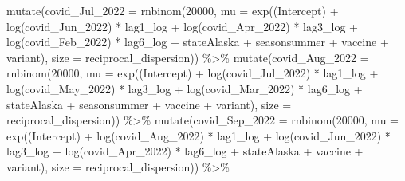 \documentclass[
]{book}
\newenvironment{Shaded}{\begin{snugshade}}{\end{snugshade}}
\newcommand{\AttributeTok}[1]{\textcolor[rgb]{0.77,0.63,0.00}{#1}}
\newcommand{\DecValTok}[1]{\textcolor[rgb]{0.00,0.00,0.81}{#1}}
\newcommand{\FunctionTok}[1]{\textcolor[rgb]{0.00,0.00,0.00}{#1}}
\newcommand{\NormalTok}[1]{#1}
\newcommand{\SpecialCharTok}[1]{\textcolor[rgb]{0.00,0.00,0.00}{#1}}
\newcommand{\StringTok}[1]{\textcolor[rgb]{0.31,0.60,0.02}{#1}}
\begin{document}
\begin{Shaded}
\begin{Highlighting}[]
  \FunctionTok{mutate}\NormalTok{(}\AttributeTok{covid\_Jul\_2022 =} \FunctionTok{rnbinom}\NormalTok{(}\DecValTok{20000}\NormalTok{, }\AttributeTok{mu =} \FunctionTok{exp}\NormalTok{(}\StringTok{\textasciigrave{}}\AttributeTok{(Intercept)}\StringTok{\textasciigrave{}} \SpecialCharTok{+} \FunctionTok{log}\NormalTok{(covid\_Jun\_2022) }\SpecialCharTok{*}\NormalTok{ lag1\_log }\SpecialCharTok{+} \FunctionTok{log}\NormalTok{(covid\_Apr\_2022) }\SpecialCharTok{*}\NormalTok{ lag3\_log }\SpecialCharTok{+} \FunctionTok{log}\NormalTok{(covid\_Feb\_2022) }\SpecialCharTok{*}\NormalTok{ lag6\_log }\SpecialCharTok{+}\NormalTok{ stateAlaska }\SpecialCharTok{+}\NormalTok{ seasonsummer }\SpecialCharTok{+}\NormalTok{ vaccine }\SpecialCharTok{+}\NormalTok{ variant), }\AttributeTok{size =}\NormalTok{ reciprocal\_dispersion))  }\SpecialCharTok{\%\textgreater{}\%}
  \FunctionTok{mutate}\NormalTok{(}\AttributeTok{covid\_Aug\_2022 =} \FunctionTok{rnbinom}\NormalTok{(}\DecValTok{20000}\NormalTok{, }\AttributeTok{mu =} \FunctionTok{exp}\NormalTok{(}\StringTok{\textasciigrave{}}\AttributeTok{(Intercept)}\StringTok{\textasciigrave{}} \SpecialCharTok{+} \FunctionTok{log}\NormalTok{(covid\_Jul\_2022) }\SpecialCharTok{*}\NormalTok{ lag1\_log }\SpecialCharTok{+} \FunctionTok{log}\NormalTok{(covid\_May\_2022) }\SpecialCharTok{*}\NormalTok{ lag3\_log }\SpecialCharTok{+} \FunctionTok{log}\NormalTok{(covid\_Mar\_2022) }\SpecialCharTok{*}\NormalTok{ lag6\_log }\SpecialCharTok{+}\NormalTok{ stateAlaska }\SpecialCharTok{+}\NormalTok{ seasonsummer }\SpecialCharTok{+}\NormalTok{ vaccine }\SpecialCharTok{+}\NormalTok{ variant), }\AttributeTok{size =}\NormalTok{ reciprocal\_dispersion))  }\SpecialCharTok{\%\textgreater{}\%}
  \FunctionTok{mutate}\NormalTok{(}\AttributeTok{covid\_Sep\_2022 =} \FunctionTok{rnbinom}\NormalTok{(}\DecValTok{20000}\NormalTok{, }\AttributeTok{mu =} \FunctionTok{exp}\NormalTok{(}\StringTok{\textasciigrave{}}\AttributeTok{(Intercept)}\StringTok{\textasciigrave{}} \SpecialCharTok{+} \FunctionTok{log}\NormalTok{(covid\_Aug\_2022) }\SpecialCharTok{*}\NormalTok{ lag1\_log }\SpecialCharTok{+} \FunctionTok{log}\NormalTok{(covid\_Jun\_2022) }\SpecialCharTok{*}\NormalTok{ lag3\_log }\SpecialCharTok{+} \FunctionTok{log}\NormalTok{(covid\_Apr\_2022) }\SpecialCharTok{*}\NormalTok{ lag6\_log }\SpecialCharTok{+}\NormalTok{ stateAlaska }\SpecialCharTok{+}\NormalTok{ vaccine }\SpecialCharTok{+}\NormalTok{ variant), }\AttributeTok{size =}\NormalTok{ reciprocal\_dispersion)) }\SpecialCharTok{\%\textgreater{}\%}

\end{Highlighting}
\end{Shaded}
\end{document}
